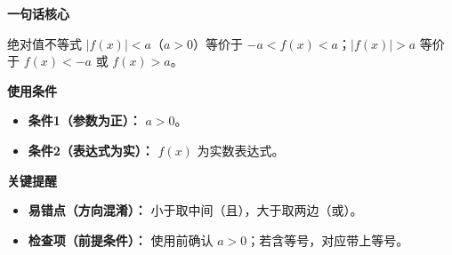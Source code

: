\begin{summarybox}
	\textbf{\textcolor{CSummary}{一句话核心}}

	绝对值不等式 $|f(x)|<a$（$a>0$）等价于 $-a<f(x)<a$；$|f(x)|>a$ 等价于 $f(x)<-a$ 或 $f(x)>a$。

	\medskip
	\textbf{\textcolor{CSummary}{使用条件}}
	\begin{itemize}[leftmargin=*, itemsep=0.5em, topsep=0.4em]
		\item \textbf{条件1（参数为正）：} $a>0$。
		\item \textbf{条件2（表达式为实）：} $f(x)$ 为实数表达式。
	\end{itemize}

	\medskip
	\textbf{\textcolor{CSummary}{关键提醒}}
	\begin{itemize}[leftmargin=*, itemsep=0.5em, topsep=0.4em]
		\item \textbf{易错点（方向混淆）：} 小于取中间（且），大于取两边（或）。
		\item \textbf{检查项（前提条件）：} 使用前确认 $a>0$；若含等号，对应带上等号。
	\end{itemize}
\end{summarybox}
